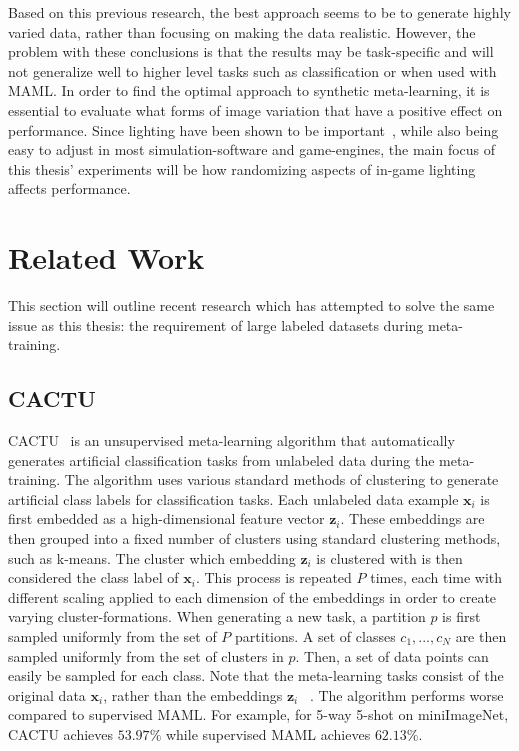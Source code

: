 Based on this previous research, the best approach seems to be to generate highly varied data, rather than focusing on making the data realistic. However, the problem with these conclusions is that the results may be task-specific and will not generalize well to higher level tasks such as classification or when used with \gls{MAML}. In order to find the optimal approach to synthetic meta-learning, it is essential to evaluate what forms of image variation that have a positive effect on performance. Since lighting have been shown to be important~\cite{goodsynthetic, domainrand, domainrandcars}, while also being easy to adjust in most simulation-software and game-engines, the main focus of this thesis' experiments will be how randomizing aspects of in-game lighting affects performance.

\section{Related Work} \label{related-work}
This section will outline recent research which has attempted to solve the same issue as this thesis: the requirement of large labeled datasets during meta-training.

\subsection{CACTU}
\Gls{CACTU}~\cite{unsup-maml} is an unsupervised meta-learning algorithm that automatically generates artificial classification tasks from unlabeled data during the meta-training. The algorithm uses various standard methods of clustering to generate artificial class labels for classification tasks. Each unlabeled data example $\mathbf{x}_i$ is first embedded as a high-dimensional feature vector $\mathbf{z}_i$. These embeddings are then grouped into a fixed number of clusters using standard clustering methods, such as k-means. The cluster which embedding $\mathbf{z}_i$ is clustered with is then considered the class label of $\mathbf{x}_i$.  This process is repeated $P$ times, each time with different scaling applied to each dimension of the embeddings in order to create varying cluster-formations. When generating a new task, a partition $p$ is first sampled uniformly from the set of $P$ partitions. A set of classes $c_1,...,c_N$ are then sampled uniformly from the set of clusters in $p$. Then, a set of data points can easily be sampled for each class. Note that the meta-learning tasks consist of the original data $\mathbf{x}_i$, rather than the embeddings $\mathbf{z}_i$ ~\cite{unsup-maml}. The algorithm performs worse compared to supervised \gls{MAML}. For example, for 5-way 5-shot on miniImageNet, \gls{CACTU} achieves $53.97\%$ while supervised \gls{MAML} achieves $62.13\%$.

